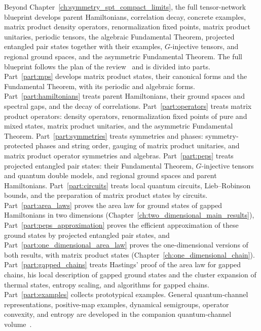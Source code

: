 \ifftmpsvolume
    Beyond Chapter~\ref{ch:symmetry_spt_compact_limits}, the full tensor-network blueprint develops
    parent Hamiltonians, correlation decay, concrete examples, matrix product
    density operators, renormalization fixed points, matrix product unitaries,
    periodic tensors, the algebraic Fundamental Theorem, projected entangled pair
    states together with their examples, $G$-injective tensors, and regional
    ground spaces, and the asymmetric Fundamental Theorem.
\else
    The full blueprint follows the plan of the review~\cite{Cirac2021Matrix}
    and is divided into parts. Part~\ref{part:mps} develops matrix product states,
    their canonical forms and the Fundamental Theorem, with its periodic and
    algebraic forms. Part~\ref{part:hamiltonians} treats parent Hamiltonians,
    their ground spaces and spectral gaps, and the decay of correlations.
    Part~\ref{part:operators} treats matrix product operators: density
    operators, renormalization fixed points of pure and mixed states, matrix
    product unitaries, and the asymmetric Fundamental Theorem.
    Part~\ref{part:symmetries} treats symmetries and phases: symmetry-protected
    phases and string order, gauging of matrix product unitaries, and matrix
    product operator symmetries and algebras. Part~\ref{part:peps} treats
    projected entangled pair states: their Fundamental Theorem, $G$-injective
    tensors and quantum double models, and regional ground spaces and parent
    Hamiltonians. Part~\ref{part:circuits} treats local quantum circuits,
    Lieb--Robinson bounds, and the preparation of matrix product states by
    circuits. Part~\ref{part:area_laws} proves the area law for ground states
    of gapped Hamiltonians in two dimensions
    (Chapter~\ref{ch:two_dimensional_main_results}),
    Part~\ref{part:peps_approximation} proves the efficient approximation of
    these ground states by projected entangled pair states, and
    Part~\ref{part:one_dimensional_area_law} proves the one-dimensional versions
    of both results, with matrix product states
    (Chapter~\ref{ch:one_dimensional_chain}).
    Part~\ref{part:gapped_chains} treats Hastings' proof of the area law for
    gapped chains, his local description of gapped ground states and the
    cluster expansion of thermal states, entropy scaling, and algorithms for
    gapped chains. Part~\ref{part:examples} collects
    prototypical examples.
\fi
General quantum-channel representations, positive-map examples, dynamical
semigroups, operator convexity, and entropy are developed in the companion
quantum-channel volume~\cite[Chapters ``Positive maps, Kraus maps and partial traces,'' ``Choi
    matrices, Kraus representations and normal forms,'' ``Positive maps that are
    not completely positive, and entanglement criteria,'' ``Operator convexity,
    Jensen's inequality and Lieb concavity,'' ``Dynamical semigroups and the GKSL
    theorem,'' and ``Von Neumann entropy and relative entropy'']{QICLean2026Blueprint}.
